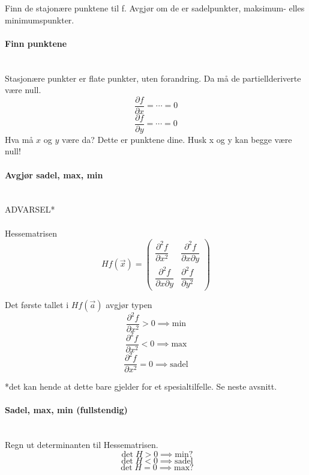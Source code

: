 Finn de stajonære punktene til f.
Avgjør om de er sadelpunkter, maksimum- elles minimumspunkter.



\paragraph{Finn punktene} \mbox{} \\
Stasjonære punkter er flate punkter, uten forandring.
Da må de partiellderiverte være null.
$$\frac{\partial f}{\partial x} = \cdots = 0$$
$$\frac{\partial f}{\partial y} = \cdots = 0$$
Hva må $x$ og $y$ være da?
Dette er punktene dine.
Husk x og y kan begge være null!



\paragraph{Avgjør sadel, max, min} \mbox{} \\
ADVARSEL*\\\\
Hessematrisen
$$Hf(\vec{x}) = \begin{pmatrix}
                \dfrac{\partial^2f}{\partial x^2}
                  & \dfrac{\partial^2f}{\partial x \partial y} \\[18pt]
                \dfrac{\partial^2f}{\partial x \partial y}
                  & \dfrac{\partial^2f}{\partial y^2}
                \end{pmatrix}$$

Det første tallet i $Hf(\vec{a})$ avgjør typen
$$\frac{\partial^2f}{\partial x^2} > 0 \implies \text{min}$$
$$\frac{\partial^2f}{\partial x^2} < 0 \implies \text{max}$$
$$\frac{\partial^2f}{\partial x^2} = 0 \implies \text{sadel}$$

*det kan hende at dette bare gjelder for et spesialtilfelle. Se neste avsnitt.



\paragraph{Sadel, max, min (fullstendig)} \mbox{} \\
Regn ut determinanten til Hessematrisen.
$$\det{H} > 0 \implies \text{min?}$$
$$\det{H} < 0 \implies \text{sadel}$$
$$\det{H} = 0 \implies \text{max?}$$

